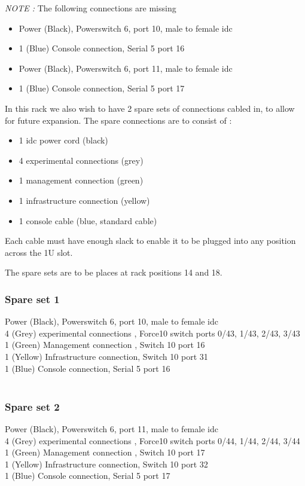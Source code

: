 \documentclass[a4paper]{article}
\begin{document}
\emph{NOTE : } The following connections are missing
\begin{itemize}
\item Power (Black), Powerswitch 6, port 10, male to female idc\\
\item 1 (Blue) Console connection, Serial 5 port 16\\
\item Power (Black), Powerswitch 6, port 11, male to female idc\\
\item 1 (Blue) Console connection, Serial 5 port 17\\
\end{itemize}

In this rack we also wish to have 2 spare sets of connections cabled
in, to allow for future expansion. The spare connections are to
consist of : 
\begin{itemize}
\item 1 idc power cord (black) 
\item 4 experimental connections (grey)
\item 1 management connection (green)
\item 1 infrastructure connection (yellow)
\item 1 console cable (blue, standard cable)
\end{itemize}

Each cable must have enough slack to enable it to be plugged into any
position across the 1U slot. 

The spare sets are to be places at rack positions 14 and 18.
\\
\subsubsection{Spare set 1}
Power (Black), Powerswitch 6, port 10, male to female idc\\
4 (Grey) experimental connections , Force10 switch ports 0/43, 1/43, 2/43, 3/43\\
1 (Green) Management connection , Switch 10 port 16\\
1 (Yellow) Infrastructure connection, Switch 10 port 31\\
1 (Blue) Console connection, Serial 5 port 16\\
\\
\subsubsection{Spare set 2}
Power (Black), Powerswitch 6, port 11, male to female idc\\
4 (Grey) experimental connections , Force10 switch ports 0/44, 1/44, 2/44, 3/44\\
1 (Green) Management connection , Switch 10 port 17\\
1 (Yellow) Infrastructure connection, Switch 10 port 32\\
1 (Blue) Console connection, Serial 5 port 17\\
\end{document}
